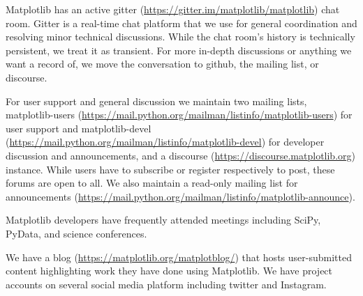 \documentclass[12pt]{article}
\numberwithin{page}{section}
\begin{document}
Matplotlib has an active gitter
(\url{https://gitter.im/matplotlib/matplotlib}) chat room.  Gitter is
a real-time chat platform that we use for general coordination and
resolving minor technical discussions.  While the chat room's history
is technically persistent, we treat it as transient.  For more
in-depth discussions or anything we want a record of, we move the
conversation to github, the mailing list, or discourse.

For user support and general discussion we maintain two mailing lists,
matplotlib-users
(\url{https://mail.python.org/mailman/listinfo/matplotlib-users}) for
user support and matplotlib-devel
(\url{https://mail.python.org/mailman/listinfo/matplotlib-devel}) for
developer discussion and announcements, and a discourse
(\url{https://discourse.matplotlib.org}) instance.  While users have
to subscribe or register respectively to post, these forums are open
to all.  We also maintain a read-only mailing list for announcements
(\url{https://mail.python.org/mailman/listinfo/matplotlib-announce}).

Matplotlib developers have frequently attended meetings including
SciPy, PyData, and science conferences.

We have a blog (\url{https://matplotlib.org/matplotblog/}) that hosts
user-submitted content highlighting work they have done using
Matplotlib.  We have project accounts on several social media platform
including twitter and Instagram.




\newpage

\def\ref@jnl#1{{\rm#1}}
\end{document}
